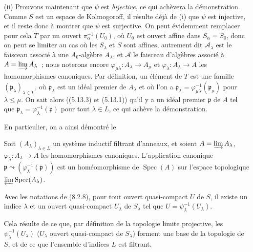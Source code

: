 \medskip
\noindent
(ii) Prouvons maintenant que $\psi$ est \emph{bijective}, ce qui achèvera la
démonstration. Comme $S$ est un espace de Kolmogoroff, il résulte déjà de (i)
que $\psi$ est injective, et il reste donc à montrer que $\psi$ est
surjective. On peut évidemment remplacer pour cela $T$ par un ouvert
$\pi_\alpha^{-1}(U_0)$, où $U_0$ est ouvert affine dans $S_\alpha=S_0$, donc
on peut se limiter au cas où les $S_\lambda$ et $S$ sont affines, autrement
dit $\mathscr A_\lambda$ est le faisceau associé à une $A_0$-algèbre
$A_\lambda$, et $\mathscr A$ le faisceau d'algèbres associé à
$A=\varinjlim A_\lambda$~; nous noterons encore
$\varphi_{\mu\lambda}:A_\lambda\to A_\mu$ et
$\varphi_\lambda:A_\lambda\to A$ les homomorphismes canoniques. Par
définition, un élément de $T$ est une famille
$(\mathfrak p_\lambda)_{\lambda\in L}$, où $\mathfrak p_\lambda$ est un
idéal premier de $A_\lambda$ et où l'on a
$\mathfrak p_\lambda=\varphi_{\mu\lambda}^{-1}(\mathfrak p_\mu)$ pour
$\lambda\leq\mu$. On sait alors ((5.13.3) et (5.13.1)) qu'il y a un idéal premier
$\mathfrak p$ de $A$ tel que
$\mathfrak p_\lambda=\varphi_\lambda^{-1}(\mathfrak p)$ pour tout
$\lambda\in L$, ce qui achève la démonstration.

En particulier, on a ainsi démontré le

\begin{corollary}[8.2.10]
\label{IV.8.2.10-fr}
Soit $(A_\lambda)_{\lambda\in L}$ un système inductif filtrant d'anneaux, et
soient $A=\varinjlim A_\lambda$, $\varphi_\lambda:A_\lambda\to A$ les
homomorphismes canoniques. L'application canonique
$\mathfrak p\leadsto(\varphi_\lambda^{-1}(\mathfrak p))$ est un
homéomorphisme de $\operatorname{Spec}(A)$ sur l'espace topologique
$\varprojlim\operatorname{Spec}(A_\lambda)$.
\end{corollary}

\begin{corollary}[8.2.11]
Avec les notations de \textup{(8.2.8)}, pour tout ouvert quasi-compact $U$ de $S$, il
existe un indice $\lambda$ et un ouvert quasi-compact $U_\lambda$ de
$S_\lambda$ tel que $U=\psi_\lambda^{-1}(U_\lambda)$.
\end{corollary}

Cela résulte de ce que, par définition de la topologie limite projective, les
$\psi_\lambda^{-1}(U_\lambda)$ ($U_\lambda$ ouvert quasi-compact de
$S_\lambda$) forment une base de la topologie de $S$, et de ce que l'ensemble
d'indices $L$ est filtrant.

